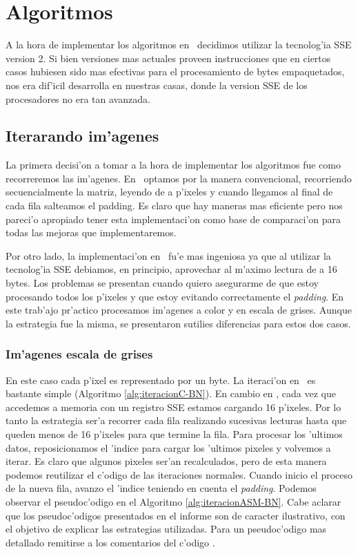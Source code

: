 \section{Algoritmos}
\label{sec:algoritmos}

A la hora de implementar los algoritmos en \ass\ decidimos utilizar la tecnolog'ia SSE version 2. Si bien versiones mas actuales proveen instrucciones que en ciertos casos hubiesen sido mas efectivas para el procesamiento de bytes empaquetados, nos era dif'icil desarrolla en nuestras casas, donde la version SSE de los procesadores no era tan avanzada.

\subsection{Iterarando im'agenes}
\label{sec:ciclos}
La primera decisi'on a tomar a la hora de implementar los algoritmos fue como recorreremos las im'agenes. En \C\ optamos por la manera convencional, recorriendo secuencialmente la matriz, leyendo de a p'ixeles y cuando llegamos al final de cada fila salteamos el padding. Es claro que hay maneras mas eficiente pero nos pareci'o apropiado tener esta implementaci'on como base de comparaci'on para todas las mejoras que implementaremos. 

Por otro lado, la implementaci'on en \ass\ fu'e mas ingeniosa ya que al utilizar la tecnolog'ia SSE debiamos, en principio, aprovechar al m'aximo lectura de a 16 bytes. Los problemas se presentan cuando quiero asegurarme de que estoy procesando todos los p'ixeles y que estoy evitando correctamente el \textit{padding}. En este trab'ajo pr'actico procesamos im'agenes a color y en escala de grises. Aunque la estrategia fue la misma, se presentaron sutilies diferencias para estos dos casos. 


\subsubsection{Im'agenes escala de grises}
En este caso cada p'ixel es representado por un byte. La iteraci'on en \C\ es bastante simple (Algoritmo \ref{alg:iteracionC-BN}). En cambio en \ass, cada vez que accedemos a memoria con un registro SSE estamos cargando 16 p'ixeles. Por lo tanto la estrategia ser'a recorrer cada fila realizando sucesivas lecturas hasta que queden menos de 16 p'ixeles para que termine la fila. Para procesar los 'ultimos datos, reposicionamos el 'indice para cargar los 'ultimos pixeles y volvemos a iterar. Es claro que algunos pixeles ser'an recalculados, pero de esta manera podemos reutilizar el c'odigo de las iteraciones normales. Cuando inicio el proceso de la nueva fila, avanzo el 'indice teniendo en cuenta el \textit{padding}. Podemos observar el pseudoc'odigo en el Algoritmo \ref{alg:iteracionASM-BN}. Cabe aclarar que los pseudoc'odigos presentados en el informe son de caracter ilustrativo, con el objetivo de explicar las estrategias utilizadas. Para un pseudoc'odigo mas detallado remitirse a los comentarios del c'odigo \ass.

